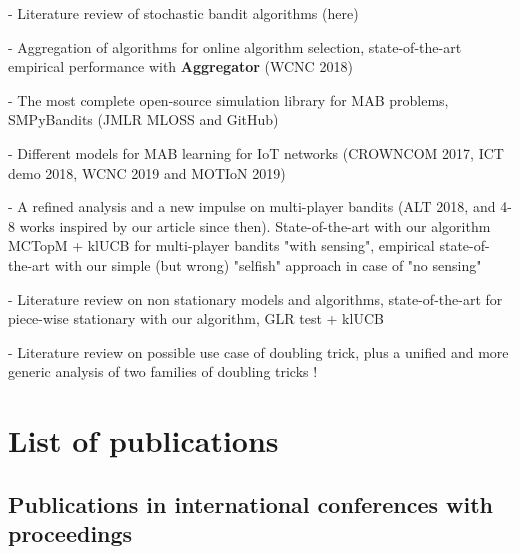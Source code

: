 - Literature review of stochastic bandit algorithms (here)

- Aggregation of algorithms for online algorithm selection, state-of-the-art empirical performance with \textbf{Aggregator} (WCNC 2018)

- The most complete open-source simulation library for MAB problems, SMPyBandits (JMLR MLOSS and GitHub)

- Different models for MAB learning for IoT networks (CROWNCOM 2017, ICT demo 2018, WCNC 2019 and MOTIoN 2019)

- A refined analysis and a new impulse on multi-player bandits (ALT 2018, and 4-8 works inspired by our article since then). State-of-the-art with our algorithm MCTopM + klUCB for multi-player bandits "with sensing", empirical state-of-the-art with our simple (but wrong) "selfish" approach in case of "no sensing"

- Literature review on non stationary models and algorithms, state-of-the-art for piece-wise stationary with our algorithm, GLR test + klUCB

- Literature review on possible use case of doubling trick, plus a unified and more generic analysis of two families of doubling tricks !


\section{List of publications}
\label{sec:1:contributions}

\subsection{Publications in international conferences with proceedings}

